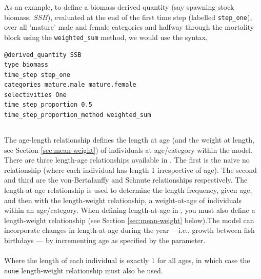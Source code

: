 As an example, to define a biomass derived quantity (say spawning stock biomass, $SSB$), evaluated at the end of the first time step (labelled \texttt{step\_one}), over all 'mature' male and female categories and halfway through the mortality block using the \texttt{weighted\_sum} method, we would use the syntax,

{\small{\begin{verbatim}
@derived_quantity SSB
type biomass
time_step step_one
categories mature.male mature.female
selectivities One
time_step_proportion 0.5
time_step_proportion_method weighted_sum
\end{verbatim}}}

\subsection{\label{sec:age-at-age}}

The age-length relationship defines the length at age (and the weight at length, see Section \ref{sec:mean-weight}) of individuals at age/category within the model. There are three length-age relationships available in \CNAME. The first is the naive no relationship (where each individual has length 1 irrespective of age). The second  and third are the von-Bertalanffy and Schnute relationships respectively. The length-at-age relationship is used to determine the length frequency, given age, and then with the length-weight relationship, a weight-at-age of individuals within an age/category. When defining length-at-age in \CNAME, you must also define a length-weight relationship (see Section \ref{sec:mean-weight} below).The model can incorporate changes in length-at-age during the year —i.e., growth between fish birthdays — by incrementing age as specified by the  parameter.

\paragraph[None]{}
Where the length of each individual is exactly 1 for all ages, in which case the \texttt{none} length-weight relationship must also be used.

